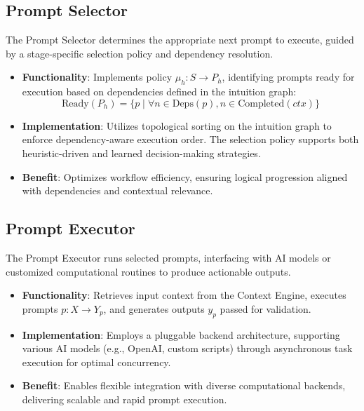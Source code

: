 \documentclass[11pt,a4paper]{article}
\begin{document}
\subsection{Prompt Selector}
\label{subsec:prompt_selector}

The Prompt Selector determines the appropriate next prompt to execute, guided by a stage-specific selection policy and dependency resolution.

\begin{itemize}
    \item \textbf{Functionality}:
    Implements policy \( \mu_h: S \rightarrow P_h \), identifying prompts ready for execution based on dependencies defined in the intuition graph:
    \[
    \text{Ready}(P_h) = \{ p \mid \forall n \in \text{Deps}(p), n \in \text{Completed}(ctx) \}
    \]

    \item \textbf{Implementation}:
    Utilizes topological sorting on the intuition graph to enforce dependency-aware execution order. The selection policy supports both heuristic-driven and learned decision-making strategies.

    \item \textbf{Benefit}:
    Optimizes workflow efficiency, ensuring logical progression aligned with dependencies and contextual relevance.
\end{itemize}

\subsection{Prompt Executor}
\label{subsec:prompt_executor}

The Prompt Executor runs selected prompts, interfacing with AI models or customized computational routines to produce actionable outputs.

\begin{itemize}
    \item \textbf{Functionality}:
    Retrieves input context from the Context Engine, executes prompts \( p: X \rightarrow Y_p \), and generates outputs \( y_p \) passed for validation.

    \item \textbf{Implementation}:
    Employs a pluggable backend architecture, supporting various AI models (e.g., OpenAI, custom scripts) through asynchronous task execution for optimal concurrency.

    \item \textbf{Benefit}:
    Enables flexible integration with diverse computational backends, delivering scalable and rapid prompt execution.
\end{itemize}
\end{document}
